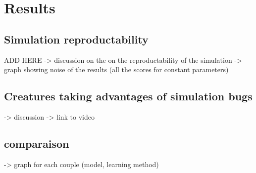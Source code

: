 
\chapter{Results} %

\label{Chapter 5} %


\section{ Simulation reproductability}
    ADD HERE -> discussion on the on the reproductability of the simulation
            -> graph showing noise of the results (all the scores for constant parameters)

\section{ Creatures taking advantages of simulation bugs}
    -> discussion
    -> link to video

\section { comparaison }

-> graph for each couple (model, learning method)




